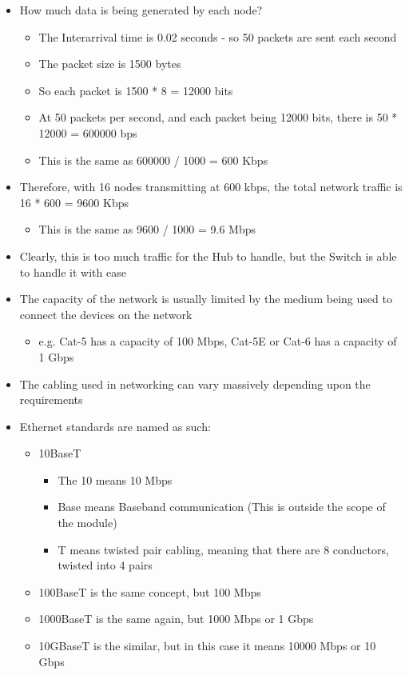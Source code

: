 \begin{itemize}
  \item How much data is being generated by each node?
  \begin{itemize}
    \item The Interarrival time is 0.02 seconds - so 50 packets are sent each second
    \item The packet size is 1500 bytes
    \item So each packet is 1500 * 8 = 12000 bits
    \item At 50 packets per second, and each packet being 12000 bits, there is 50 * 12000 = 600000 bps
    \item This is the same as 600000 / 1000 = 600 Kbps
  \end{itemize}
  \item Therefore, with 16 nodes transmitting at 600 kbps, the total network traffic is 16 * 600 = 9600 Kbps
  \begin{itemize}
    \item This is the same as 9600 / 1000 = 9.6 Mbps
  \end{itemize}
  \item Clearly, this is too much traffic for the Hub to handle, but the Switch is able to handle it with ease
  \item The capacity of the network is usually limited by the medium being used to connect the devices on the network
  \begin{itemize}
    \item e.g. Cat-5 has a capacity of 100 Mbps, Cat-5E or Cat-6 has a capacity of 1 Gbps
  \end{itemize}
  \item The cabling used in networking can vary massively depending upon the requirements
  \item Ethernet standards are named as such:
  \begin{itemize}
    \item 10BaseT
    \begin{itemize}
      \item The 10 means 10 Mbps
      \item Base means Baseband communication (This is outside the scope of the module)
      \item T means twisted pair cabling, meaning that there are 8 conductors, twisted into 4 pairs
    \end{itemize}
    \item 100BaseT is the same concept, but 100 Mbps
    \item 1000BaseT is the same again, but 1000 Mbps or 1 Gbps
    \item 10GBaseT is the similar, but in this case it means 10000 Mbps or 10 Gbps
  \end{itemize}
\end{itemize}

